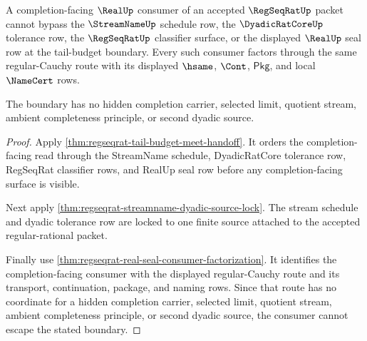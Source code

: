 \begin{theorem}
\label{thm:regseqrat-tail-budget-real-seal-nonescape}
A completion-facing $\RealUp$ consumer of an accepted $\RegSeqRatUp$ packet
cannot bypass the $\StreamNameUp$ schedule row, the $\DyadicRatCoreUp$
tolerance row, the $\RegSeqRatUp$ classifier surface, or the displayed
$\RealUp$ seal row at the tail-budget boundary. Every such consumer factors
through the same regular-Cauchy route with its displayed $\hsame$, $\Cont$,
$\mathsf{Pkg}$, and local $\NameCert$ rows.

The boundary has no hidden completion carrier, selected limit, quotient stream,
ambient completeness principle, or second dyadic source.
\end{theorem}
\begin{proof}
Apply \autoref{thm:regseqrat-tail-budget-meet-handoff}. It orders the
completion-facing read through the StreamName schedule, DyadicRatCore tolerance
row, RegSeqRat classifier rows, and RealUp seal row before any completion-facing
surface is visible.

Next apply \autoref{thm:regseqrat-streamname-dyadic-source-lock}. The stream
schedule and dyadic tolerance row are locked to one finite source attached to
the accepted regular-rational packet.

Finally use \autoref{thm:regseqrat-real-seal-consumer-factorization}. It
identifies the completion-facing consumer with the displayed regular-Cauchy
route and its transport, continuation, package, and naming rows. Since that
route has no coordinate for a hidden completion carrier, selected limit,
quotient stream, ambient completeness principle, or second dyadic source, the
consumer cannot escape the stated boundary.
\end{proof}

